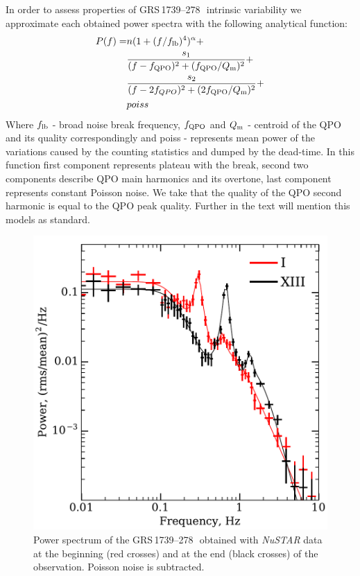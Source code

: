 \documentclass[a4paper,fleqn,usenatbib]{mnras}
\def\grs{{GRS\,1739--278\,}}
\begin{document}
In order to assess properties of \grs\ intrinsic variability we approximate each obtained power spectra with the following analytical function:
\begin{equation}
        \begin{aligned}
                P(f)  = & n (1 + (f/f_{\rm lb})^4)^{\alpha} + \\
                     &\frac{s_1}{(f - f_{\rm QPO})^2 + (f_{\rm QPO}/Q_{\rm m})^2} +\\
                        & \frac{s_2}{(f - 2f_{QPO})^2 + (2f_{\rm QPO}/Q_{\rm m})^2} + \\
                        & poiss
\end{aligned}
        \label{eq:complex_fit}
\end{equation}
Where $f_{\rm lb}$ - broad noise break frequency, $f_{\rm QPO}$ and $Q_{\rm m}$ - centroid of the QPO and its quality correspondingly and poiss - represents mean power of the variations caused by the counting statistics and dumped by the dead-time.
In this function first component represents plateau with the break, second two components describe QPO main harmonics and its overtone, last component represents constant Poisson noise.
We take that the quality of the QPO second harmonic is equal to the QPO peak quality.
Further in the text will mention this models as standard.

\begin{figure}
        \includegraphics[width=\columnwidth]{qpo_centroid_evolution.pdf}
        \caption{Power spectrum of the \grs\ obtained with {\it NuSTAR} data at the beginning (red crosses) and at the end (black crosses) of the observation. Poisson noise is subtracted.}
        \label{fig:qpo}
\end{figure}
\end{document}
